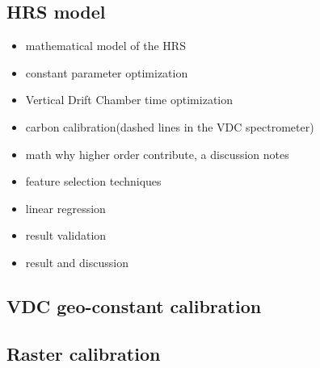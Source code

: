 \subsection{HRS model}

\begin{itemize}
    \item mathematical model of the HRS
    \item constant parameter optimization
    \item Vertical Drift Chamber time optimization
    \item carbon calibration(dashed lines in the VDC spectrometer)
    \item math why higher order contribute, a discussion notes
    \item feature selection techniques
    \item linear regression
    \item result validation
    \item result and discussion
\end{itemize}

\subsection{VDC geo-constant calibration}
\subsection{Raster calibration}








